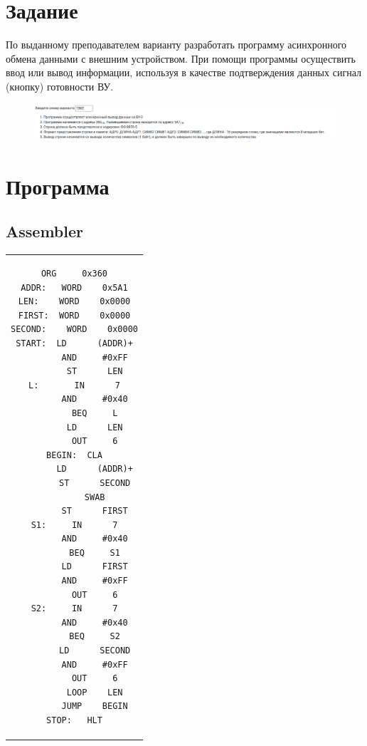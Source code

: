

\section{Задание}
По выданному преподавателем варианту разработать программу асинхронного обмена данными с внешним устройством. При помощи
программы осуществить ввод или вывод информации, используя в качестве подтверждения данных сигнал (кнопку) готовности ВУ.


\begin{figure}[H]
    \centering
    \includegraphics[scale=0.35]{img/variant}
\end{figure}


\section{Программа}

\subsection{Assembler}

\begin{center}
    \begin{tabular}{c}
        \begin{lstlisting}[basicstyle=\ttfamily]
        ORG     0x360
ADDR:	WORD	0x5A1
LEN:	WORD	0x0000
FIRST:	WORD	0x0000
SECOND:    WORD    0x0000
START:  LD      (ADDR)+
        AND     #0xFF
        ST      LEN
L:       IN      7
        AND     #0x40
        BEQ     L
        LD      LEN
        OUT     6
BEGIN:	CLA
        LD      (ADDR)+
        ST      SECOND
        SWAB
        ST      FIRST
S1:     IN      7
        AND     #0x40
        BEQ     S1
        LD      FIRST
        AND     #0xFF
        OUT     6
S2:     IN      7
        AND     #0x40
        BEQ     S2
        LD      SECOND
        AND     #0xFF
        OUT     6
        LOOP    LEN
        JUMP    BEGIN
STOP:	HLT

        \end{lstlisting}
    \end{tabular}
\end{center}

\newpage

